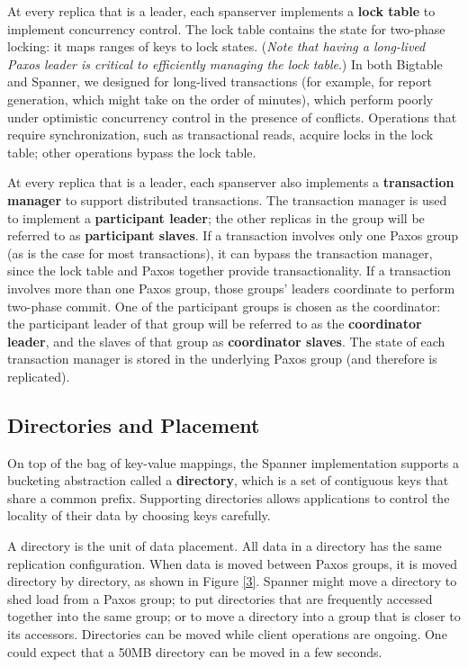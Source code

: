 \documentclass[11pt]{article}
\begin{document}
At every replica that is a leader, each spanserver implements a \textbf{lock table} to implement concurrency
control. The lock table contains the state for two-phase locking: it maps ranges of keys to lock
states. (\emph{Note that having a long-lived Paxos leader is critical to efficiently managing the lock
table}.) In both Bigtable and Spanner, we designed for long-lived transactions (for example, for report
generation, which might take on the order of minutes), which perform poorly under optimistic
concurrency control in the presence of conflicts. Operations that require synchronization, such as
transactional reads, acquire locks in the lock table; other operations bypass the lock table.

At every replica that is a leader, each spanserver also implements a \textbf{transaction manager} to support
distributed transactions. The transaction manager is used to implement a \textbf{participant leader}; the other
replicas in the group will be referred to as \textbf{participant slaves}. If a transaction involves only one
Paxos group (as is the case for most transactions), it can bypass the transaction manager, since the
lock table and Paxos together provide transactionality. If a transaction involves more than one Paxos
group, those groups' leaders coordinate to perform two-phase commit. One of the participant groups is
chosen as the coordinator: the participant leader of that group will be referred to as the \textbf{coordinator
leader}, and the slaves of that group as \textbf{coordinator slaves}. The state of each transaction manager is
stored in the underlying Paxos group (and therefore is replicated).
\subsection{Directories and Placement}
\label{sec:orgd3474ca}
On top of the bag of key-value mappings, the Spanner implementation supports a bucketing abstraction
called a \textbf{directory}, which is a set of contiguous keys that share a common prefix. Supporting
directories allows applications to control the locality of their data by choosing keys carefully.

A directory is the unit of data placement. All data in a directory has the same replication
configuration. When data is moved between Paxos groups, it is moved directory by directory, as shown
in Figure \ref{3}. Spanner might move a directory to shed load from a Paxos group; to put directories
that are frequently accessed together into the same group; or to move a directory into a group that is
closer to its accessors. Directories can be moved while client operations are ongoing. One could
expect that a 50MB directory can be moved in a few seconds.
\end{document}
